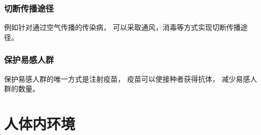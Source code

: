 \documentclass[UTF8]{ctexart}
\begin{document}
\subsubsection{切断传播途径}
    例如针对通过空气传播的传染病，
    可以采取通风，消毒等方式实现切断传播途径。

\subsubsection{保护易感人群}
    保护易感人群的唯一方式是注射疫苗，
    疫苗可以使接种者获得抗体，
    减少易感人群的数量。

\newpage

\section{人体内环境}
\end{document}
